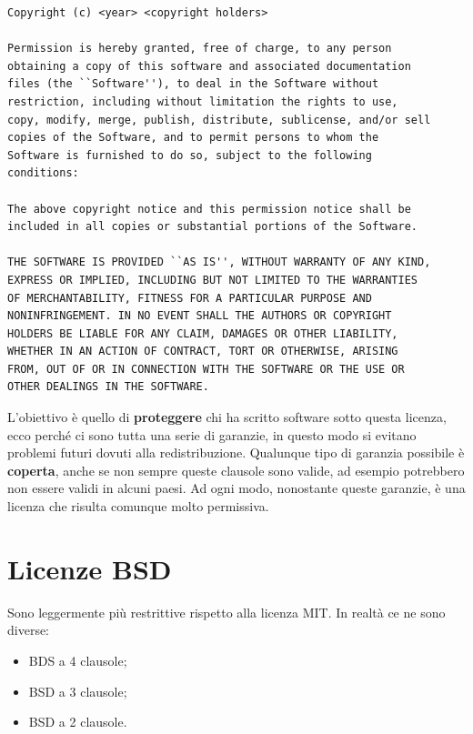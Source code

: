 \begin{lstlisting}[caption=Licenza MIT]
Copyright (c) <year> <copyright holders>

Permission is hereby granted, free of charge, to any person
obtaining a copy of this software and associated documentation
files (the ``Software''), to deal in the Software without
restriction, including without limitation the rights to use,
copy, modify, merge, publish, distribute, sublicense, and/or sell
copies of the Software, and to permit persons to whom the
Software is furnished to do so, subject to the following
conditions:

The above copyright notice and this permission notice shall be
included in all copies or substantial portions of the Software.

THE SOFTWARE IS PROVIDED ``AS IS'', WITHOUT WARRANTY OF ANY KIND,
EXPRESS OR IMPLIED, INCLUDING BUT NOT LIMITED TO THE WARRANTIES
OF MERCHANTABILITY, FITNESS FOR A PARTICULAR PURPOSE AND
NONINFRINGEMENT. IN NO EVENT SHALL THE AUTHORS OR COPYRIGHT
HOLDERS BE LIABLE FOR ANY CLAIM, DAMAGES OR OTHER LIABILITY,
WHETHER IN AN ACTION OF CONTRACT, TORT OR OTHERWISE, ARISING
FROM, OUT OF OR IN CONNECTION WITH THE SOFTWARE OR THE USE OR
OTHER DEALINGS IN THE SOFTWARE.

\end{lstlisting}

\noindent L'obiettivo è quello di \textbf{proteggere} chi ha scritto software sotto questa licenza, ecco perché ci sono tutta una serie di garanzie, in questo modo si evitano problemi futuri dovuti alla redistribuzione. Qualunque tipo di garanzia possibile è \textbf{coperta}, anche se non sempre queste clausole sono valide, ad esempio potrebbero non essere validi in alcuni paesi. Ad ogni modo, nonostante queste garanzie, è una licenza che risulta comunque molto permissiva. 

\section{Licenze BSD}

Sono leggermente più restrittive rispetto alla licenza MIT. In realtà ce ne sono diverse:

\begin{itemize}

\item BDS a 4 clausole;
\item BSD a 3 clausole;
\item BSD a 2 clausole.

\end{itemize}

